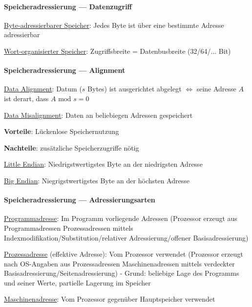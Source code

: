 \paragraph{Speicheradressierung --- Datenzugriff}
\begin{enumeration}
	\item \underline{Byte-adressierbarer Speicher}: Jedes Byte ist über eine bestimmte Adresse adressierbar
	\item \underline{Wort-organisierter Speicher}: Zugriffsbreite = Datenbusbreite (32/64/... Bit)
\end{enumeration}

\paragraph{Speicheradressierung --- Alignment}
\begin{items}
	\item \underline{Data Alignment}: Datum ($s$ Bytes) ist ausgerichtet abgelegt $\Leftrightarrow$ seine Adresse $A$ ist derart, dass $A \text{ mod } s = 0$
	\item \underline{Data Misalignment}: Daten an beliebiegen Adressen gespeichert
	\begin{items}
		\item \textbf{Vorteile}: Lückenlose Speichernutzung
		\item \textbf{Nachteile}: zusätzliche Speicherzugriffe nötig
	\end{items}
	\item \underline{Little Endian}: Niedrigstwertigstes Byte an der niedrigsten Adresse
	\item \underline{Big Endian}: Niegrigstwertigstes Byte an der höchsten Adresse
\end{items}

\paragraph{Speicheradressierung --- Adressierungsarten}
\begin{enumeration}
	\item \underline{Programmadresse}: Im Programm vorliegende Adressen (Prozessor erzeugt aus Programmadressen Prozessadressen mittels Indexmodifikation/Substitution/relativer Adressierung/offener Basisadressierung)
	\item \underline{Prozessadresse} (effektive Adresse): Vom Prozessor verwendet (Prozessor erzeugt nach OS-Angaben aus Prozessadressen Maschinenadressen mittels verdeckter Basisadressierung/Seitenadressierung) - Grund: beliebige Lage des Programms und seiner Werte, partielle Lagerung im Speicher 
	\item \underline{Maschinenadresse}: Vom Prozessor gegenüber Hauptspeicher verwendet
\end{enumeration}

